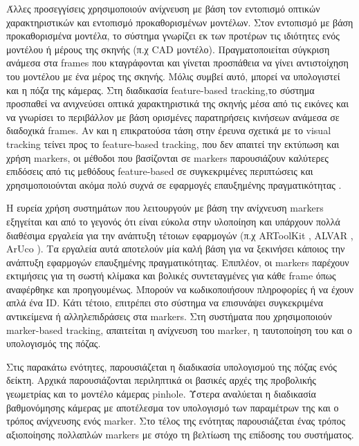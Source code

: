 Άλλες προσεγγίσεις χρησιμοποιούν ανίχνευση με βάση τον εντοπισμό οπτικών χαρακτηριστικών και εντοπισμό προκαθορισμένων μοντέλων. Στον εντοπισμό με βάση προκαθορισμένα μοντέλα, το σύστημα γνωρίζει εκ των προτέρων τις ιδιότητες ενός μοντέλου ή μέρους της σκηνής (π.χ CAD μοντέλο). Πραγματοποιείται σύγκριση ανάμεσα στα frames που κταγράφονται και γίνεται προσπάθεια να γίνει αντιστοίχηση του μοντέλου με ένα μέρος της σκηνής. Μόλις συμβεί αυτό, μπορεί να υπολογιστεί και η πόζα της κάμερας. Στη διαδικασία feature-based tracking,το σύστημα προσπαθεί να ανιχνεύσει οπτικά χαρακτηριστικά της σκηνής μέσα από τις εικόνες και να γνωρίσει το περιβάλλον με βάση ορισμένες παρατηρήσεις κινήσεων ανάμεσα σε διαδοχικά frames. Αν και η επικρατούσα τάση στην έρευνα σχετικά με το visual tracking τείνει προς το feature-based tracking, που δεν απαιτεί την εκτύπωση και χρήση markers, οι μέθοδοι που βασίζονται σε markers παρουσιάζουν καλύτερες επιδόσεις από τις μεθόδους feature-based σε συγκεκριμένες περιπτώσεις και χρησιμοποιούνται ακόμα πολύ συχνά σε εφαρμογές επαυξημένης πραγματικότητας \cite{wagner2008robust} \cite{rabbi2014applications} .


Η ευρεία χρήση συστημάτων που λειτουργούν με βάση την ανίχνευση markers εξηγείται και από το γεγονός ότι είναι εύκολα στην υλοποίηση και υπάρχουν πολλά διαθέσιμα εργαλεία για την ανάπτυξη τέτοιων εφαρμογών (π.χ ARToolKit \cite{artoolkit}, ALVAR \cite{alvar}, ArUco \cite{aruco}). Τα εργαλεία αυτά αποτελούν μία καλή βάση για να ξεκινήσει κάποιος την ανάπτυξη εφαρμογών επαυξημένης πραγματικότητας. Επιπλέον, οι markers παρέχουν εκτιμήσεις για τη σωστή κλίμακα και βολικές συντεταγμένες για κάθε frame όπως αναφέρθηκε και προηγουμένως. Μπορούν να κωδικοποιήσουν πληροφορίες ή να έχουν απλά ένα ID. Κάτι τέτοιο, επιτρέπει στο σύστημα να επισυνάψει συγκεκριμένα αντικείμενα ή αλληλεπιδράσεις στα markers. Στη συστήματα που χρησιμοποιούν marker-based tracking, απαιτείται η ανίχνευση του marker, η ταυτοποίηση του και ο υπολογισμός της πόζας. 

Στις παρακάτω ενότητες, παρουσιάζεται η διαδικασία υπολογισμού της πόζας ενός δείκτη. Αρχικά παρουσιάζονται περιληπτικά οι βασικές αρχές της προβολικής γεωμετρίας και το μοντέλο κάμερας pinhole. Ύστερα αναλύεται η διαδικασία βαθμονόμησης κάμερας με αποτέλεσμα τον υπολογισμό των παραμέτρων της και ο τρόπος ανίχνευσης ενός marker. Στο τέλος της ενότητας παρουσιάζεται ένας τρόπος αξιοποίησης πολλαπλών markers με στόχο τη βελτίωση της επίδοσης του συστήματος.




